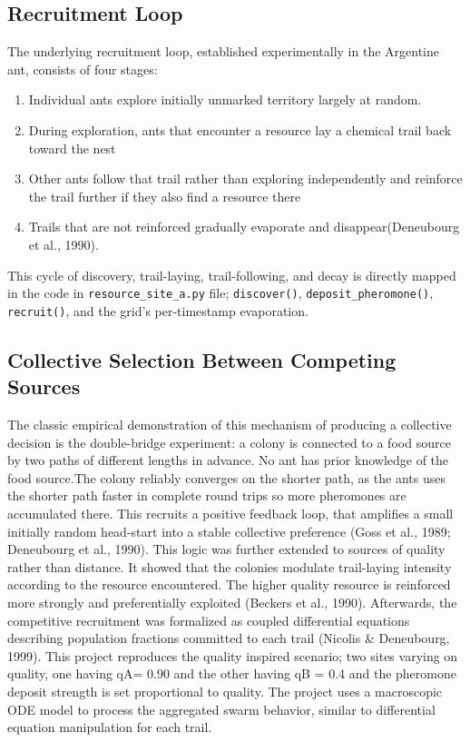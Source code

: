 \documentclass{article}
\begin{document}
\subsection{Recruitment Loop}
The underlying recruitment loop, established experimentally in the Argentine ant, consists of four stages:
\begin{enumerate}
    \item Individual ants explore initially unmarked territory largely at random.
    \item During exploration, ants that encounter a resource lay a chemical trail back toward the nest
    \item Other ants follow that trail rather than exploring independently and reinforce the trail further if they also find a resource there
    \item Trails that are not reinforced gradually evaporate and disappear(Deneubourg et al., 1990).
\end{enumerate}
This cycle of discovery, trail-laying, trail-following, and decay is directly mapped in the code in \texttt{resource\_site\_a.py} file; \texttt{discover()}, \texttt{deposit\_pheromone()}, \texttt{recruit()}, and the grid's per-timestamp evaporation.

\subsection{Collective Selection Between Competing Sources}
The classic empirical demonstration of this mechanism of producing a collective decision is the double-bridge experiment: a colony is connected to a food source by two paths of different lengths in advance. No ant has prior knowledge of the food source.The colony reliably converges on the shorter path, as the ants uses the shorter path faster in complete round trips so more pheromones are accumulated there. This recruits a positive feedback loop, that amplifies a small initially random head-start into a stable collective preference (Goss et al., 1989; Deneubourg et al., 1990). This logic was further extended to sources of quality rather than distance. It showed that the colonies modulate trail-laying intensity according to the resource encountered. The higher quality resource is reinforced more strongly and preferentially exploited (Beckers et al., 1990). Afterwards, the competitive recruitment was formalized as coupled differential equations describing population fractions committed to each trail (Nicolis \& Deneubourg, 1999). This project reproduces the quality inspired scenario; two sites varying on quality, one having qA= 0.90 and the other having qB = 0.4 and the pheromone deposit strength is set proportional to quality.  
The project uses a macroscopic ODE model to process the aggregated swarm behavior, similar to differential equation manipulation for each trail. 
\end{document}
